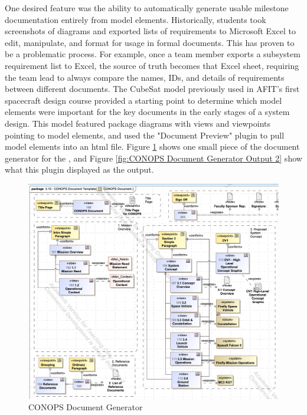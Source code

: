 One desired feature was the ability to automatically generate usable milestone documentation entirely from model elements. Historically, students took screenshots of diagrams and exported lists of requirements to Microsoft Excel to edit, manipulate, and format for usage in formal documents. This has proven to be a problematic process. For example, once a team member exports a subsystem requirement list to Excel, the source of truth becomes that Excel sheet, requiring the team lead to always compare the names, IDs, and details of requirements between different documents. The CubeSat model previously used in AFIT's first spacecraft design course provided a starting point to determine which model elements were important for the key documents in the early stages of a system design. This model featured package diagrams with views and viewpoints pointing to model elements, and used the "Document Preview" plugin to pull model elements into an html file. Figure \ref{fig:CONOPS Document Generator} shows one small piece of the document generator for the , and Figure \ref{fig:CONOPS Document Generator Output 2} show what this plugin displayed as the output. 

\begin{figure}
    \centering
    \includegraphics[width=\textwidth]{Thesis/Literature_Review/Lit Review Figures/ayres document generator.png}
    \caption{CONOPS Document Generator}
    \label{fig:CONOPS Document Generator}
\end{figure}

